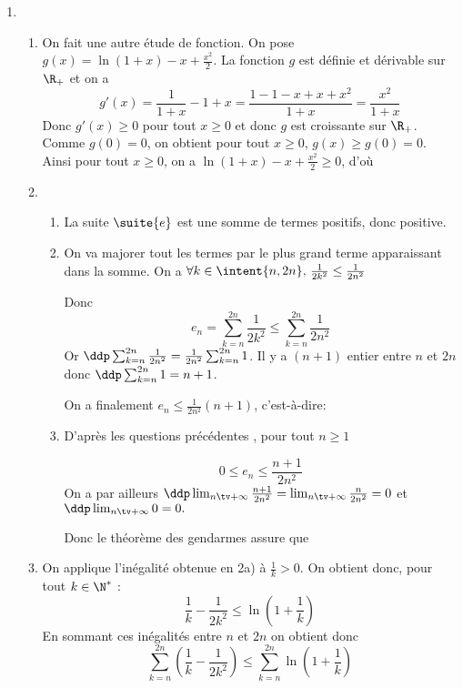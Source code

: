 \begin{correction}
\begin{enumerate}
\begin{enumerate}
 
\end{enumerate}
\item \begin{enumerate}
\item On fait une autre étude de fonction. On pose 
$g(x) =\ln(1+x) -x+\frac{x^2}{2}$. La fonction $g$ est définie et dérivable sur $\R_+$ et on a 
$$g'(x) = \frac{1}{1+x}-1 +x = \frac{1-1-x+x+x^2}{1+x}= \frac{x^2}{1+x}$$
Donc $g'(x)\geq 0 $ pour tout $x\geq 0$ et donc 
$g$ est croissante sur $\R_+$. Comme $g(0) = 0$, on obtient pour tout $x\geq 0$, $g(x)\geq g(0) =0 $.
Ainsi   pour tout $x\geq 0$, on a $\ln(1+x) -x+\frac{x^2}{2} \geq 0$, d'où

\item 
\begin{enumerate}
\item La suite $\suite{e}$ est une somme de termes positifs, donc positive.
\item On va majorer tout les termes par le plus grand terme apparaissant dans la somme. On a 
$\forall k\in \intent{n,2n} , \, \frac{1}{2k^2} \leq \frac{1}{2n^2}$

Donc $$e_n =\sum_{k=n}^{2n} \frac{1}{2k^2}\leq \sum_{k=n}^{2n}  \frac{1}{2n^2}$$
Or $\ddp \sum_{k=n}^{2n}  \frac{1}{2n^2} = \frac{1}{2n^2} \sum_{k=n}^{2n} 1$. 
Il y a $(n+1)$ entier entre $n $ et $2n$ donc 
$\ddp \sum_{k=n}^{2n} 1 =n+1$.

On a finalement 
$e_n \leq \frac{1}{2n^2} (n+1)$, c'est-à-dire:

\item D'après les questions précédentes , pour tout $n\geq 1$ 

$$0\leq e_n \leq  \frac{n+1}{2n^2}$$
On a par ailleurs $\ddp  \lim_{n\tv +\infty } \frac{n+1}{2n^2} =\lim_{n\tv +\infty} \frac{n}{2n^2} = 0$ et $\ddp \lim_{n\tv +\infty} 0=0.$

Donc le théorème des gendarmes assure que 

\end{enumerate}


\item On applique l'inégalité obtenue en 2a) à $\frac{1}{k}>0$. On obtient donc, pour tout $k\in \N^*$ : 
$$\frac{1}{k}-\frac{1}{2k^2}\leq \ln\left(1+\frac{1}{k} \right)$$
En sommant ces inégalités entre $n$ et $2n$ on obtient donc 
$$\sum_{k=n}^{2n} \left(\frac{1}{k}-\frac{1}{2k^2}\right) \leq \sum_{k=n}^{2n}\ln\left(1+\frac{1}{k} \right)$$


\end{enumerate}
\end{enumerate}
\end{correction}
